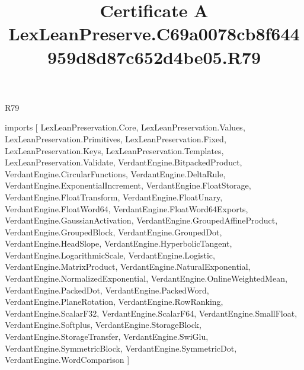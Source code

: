 \begin{lexlean}{R79}
\title{Certificate A LexLeanPreserve.C69a0078cb8f644959d8d87c652d4be05.R79}
\begin{coremodule}
imports [
  LexLeanPreservation.Core,
  LexLeanPreservation.Values,
  LexLeanPreservation.Primitives,
  LexLeanPreservation.Fixed,
  LexLeanPreservation.Keys,
  LexLeanPreservation.Templates,
  LexLeanPreservation.Validate,
  VerdantEngine.BitpackedProduct,
  VerdantEngine.CircularFunctions,
  VerdantEngine.DeltaRule,
  VerdantEngine.ExponentialIncrement,
  VerdantEngine.FloatStorage,
  VerdantEngine.FloatTransform,
  VerdantEngine.FloatUnary,
  VerdantEngine.FloatWord64,
  VerdantEngine.FloatWord64Exports,
  VerdantEngine.GaussianActivation,
  VerdantEngine.GroupedAffineProduct,
  VerdantEngine.GroupedBlock,
  VerdantEngine.GroupedDot,
  VerdantEngine.HeadSlope,
  VerdantEngine.HyperbolicTangent,
  VerdantEngine.LogarithmicScale,
  VerdantEngine.Logistic,
  VerdantEngine.MatrixProduct,
  VerdantEngine.NaturalExponential,
  VerdantEngine.NormalizedExponential,
  VerdantEngine.OnlineWeightedMean,
  VerdantEngine.PackedDot,
  VerdantEngine.PackedWord,
  VerdantEngine.PlaneRotation,
  VerdantEngine.RowRanking,
  VerdantEngine.ScalarF32,
  VerdantEngine.ScalarF64,
  VerdantEngine.SmallFloat,
  VerdantEngine.Softplus,
  VerdantEngine.StorageBlock,
  VerdantEngine.StorageTransfer,
  VerdantEngine.SwiGlu,
  VerdantEngine.SymmetricBlock,
  VerdantEngine.SymmetricDot,
  VerdantEngine.WordComparison
]


\end{coremodule}
\end{lexlean}
